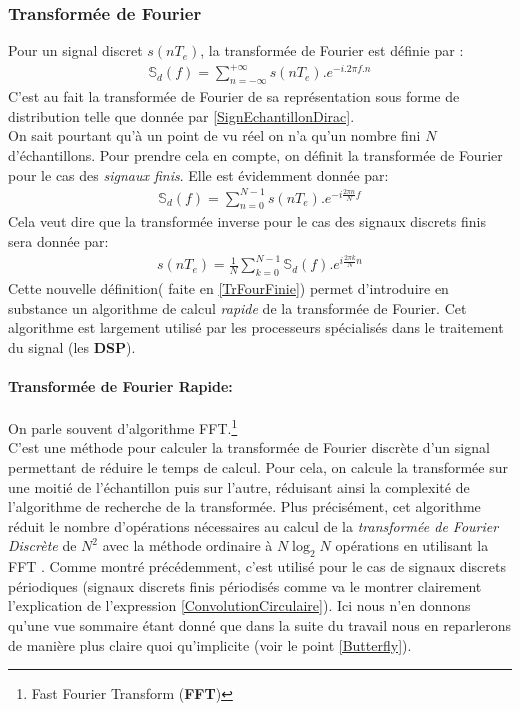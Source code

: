 \subsubsection{Transformée de Fourier \cite{TraitSignMath}}
Pour un signal discret $ s(nT_{e}) $, la transformée de Fourier est définie par :
\begin{eqnarray}
\mathbb{S}_{d}(f) = \sum_{n = -\infty}^{+\infty}s(nT_{e}).e^{-i.2 \pi f.n}
\end{eqnarray}
C'est au fait la transformée de Fourier de sa représentation sous forme de distribution telle que donnée par \ref{SignEchantillonDirac}.\\
On sait pourtant qu'à un point de vu réel on n'a qu'un nombre fini $ N $ d'échantillons. Pour prendre cela en compte, on définit la transformée de Fourier pour le cas des \emph{signaux finis}. Elle est évidemment donnée par:
\begin{eqnarray}\label{TrFourFinie}
\mathbb{S}_{d}(f) = \sum_{n = 0}^{N-1}s(nT_{e}).e^{-i \frac{2 \pi n}{N} f}
\end{eqnarray}
Cela veut dire que la transformée inverse pour le cas des signaux discrets finis sera donnée par:
\begin{eqnarray}
s(nT_{e}) = \frac{1}{N}\sum_{k = 0}^{N-1}\mathbb{S}_{d}(f).e^{i \frac{2 \pi k}{N} n}
\end{eqnarray}
Cette nouvelle définition( faite en \ref{TrFourFinie}) permet d'introduire en substance un algorithme de calcul \emph{rapide} de la transformée de Fourier. Cet algorithme est largement utilisé par les processeurs spécialisés dans le traitement du signal (les \textbf{DSP}).
\paragraph{Transformée de Fourier Rapide:}On parle souvent d'algorithme FFT.\footnote{Fast Fourier Transform (\textbf{FFT})}\\
C'est une méthode pour calculer la transformée de Fourier discrète d'un signal permettant de réduire le temps de calcul. Pour cela, on calcule la transformée sur une moitié de l'échantillon puis sur l'autre, réduisant ainsi la complexité de l'algorithme de recherche de la transformée. Plus précisément, cet algorithme réduit le nombre d'opérations nécessaires au calcul de la \emph{transformée de Fourier Discrète} de  $ N^{2} $  avec la méthode ordinaire à  $ N\log_{2}{N} $  opérations en utilisant la FFT \cite{Unified}. Comme montré précédemment, c'est utilisé pour le cas de signaux discrets périodiques (signaux discrets finis périodisés comme va le montrer clairement l'explication de l'expression \ref{ConvolutionCirculaire}).  Ici nous n'en donnons qu'une vue sommaire étant donné que dans la suite du travail nous en reparlerons de manière plus claire quoi qu'implicite (voir le point \ref{Butterfly}).\newpage

